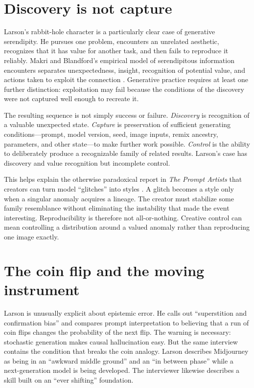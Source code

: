 \documentclass[11pt]{article}
\begin{document}
\section{Discovery is not capture}
Larson’s rabbit-hole character is a particularly clear case of generative serendipity. He pursues one problem, encounters an unrelated aesthetic, recognizes that it has value for another task, and then fails to reproduce it reliably. Makri and Blandford’s empirical model of serendipitous information encounters separates unexpectedness, insight, recognition of potential value, and actions taken to exploit the connection \cite{MakriBlandford2012}. Generative practice requires at least one further distinction: exploitation may fail because the conditions of the discovery were not captured well enough to recreate it.

The resulting sequence is not simply success or failure. \emph{Discovery} is recognition of a valuable unexpected state. \emph{Capture} is preservation of sufficient generating conditions—prompt, model version, seed, image inputs, remix ancestry, parameters, and other state—to make further work possible. \emph{Control} is the ability to deliberately produce a recognizable family of related results. Larson’s case has discovery and value recognition but incomplete control.

This helps explain the otherwise paradoxical report in \emph{The Prompt Artists} that creators can turn model ``glitches'' into styles \cite{ChangEtAl2023PromptArtists}. A glitch becomes a style only when a singular anomaly acquires a lineage. The creator must stabilize some family resemblance without eliminating the instability that made the event interesting. Reproducibility is therefore not all-or-nothing. Creative control can mean controlling a distribution around a valued anomaly rather than reproducing one image exactly.

\section{The coin flip and the moving instrument}
Larson is unusually explicit about epistemic error. He calls out ``superstition and confirmation bias'' and compares prompt interpretation to believing that a run of coin flips changes the probability of the next flip. The warning is necessary: stochastic generation makes causal hallucination easy. But the same interview contains the condition that breaks the coin analogy. Larson describes Midjourney as being in an ``awkward middle ground'' and an ``in between phase'' while a next-generation model is being developed. The interviewer likewise describes a skill built on an ``ever shifting'' foundation.
\end{document}
